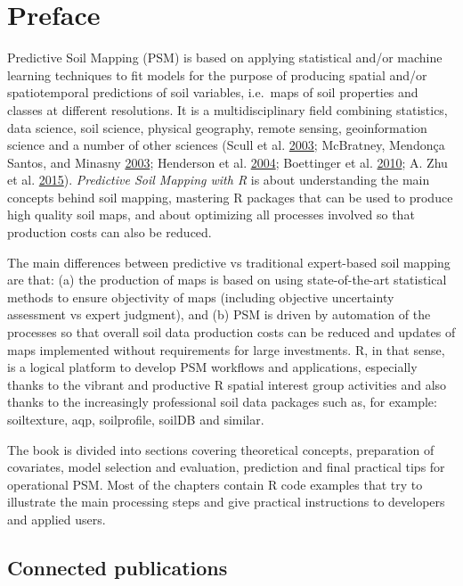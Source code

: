 \documentclass[graybox,natbib,nospthms]{svmono}
\begin{document}
\section*{Preface}\label{preface}

Predictive Soil Mapping (PSM) is based on applying statistical and/or
machine learning techniques to fit models for the purpose of producing
spatial and/or spatiotemporal predictions of soil variables, i.e.~maps
of soil properties and classes at different resolutions. It is a
multidisciplinary field combining statistics, data science, soil
science, physical geography, remote sensing, geoinformation science and
a number of other sciences (Scull et al.
\protect\hyperlink{ref-Scul01}{2003}; McBratney, Mendonça Santos, and
Minasny \protect\hyperlink{ref-MCBRATNEY20033}{2003}; Henderson et al.
\protect\hyperlink{ref-Henderson2004Geoderma}{2004}; Boettinger et al.
\protect\hyperlink{ref-Boettinger2010Springer}{2010}; A. Zhu et al.
\protect\hyperlink{ref-Zhu2015PSM}{2015}). \emph{Predictive Soil Mapping
with R} is about understanding the main concepts behind soil mapping,
mastering R packages that can be used to produce high quality soil maps,
and about optimizing all processes involved so that production costs can
also be reduced.

The main differences between predictive vs traditional expert-based soil
mapping are that: (a) the production of maps is based on using
state-of-the-art statistical methods to ensure objectivity of maps
(including objective uncertainty assessment vs expert judgment), and (b)
PSM is driven by automation of the processes so that overall soil data
production costs can be reduced and updates of maps implemented without
requirements for large investments. R, in that sense, is a logical
platform to develop PSM workflows and applications, especially thanks to
the vibrant and productive R spatial interest group activities and also
thanks to the increasingly professional soil data packages such as, for
example: soiltexture, aqp, soilprofile, soilDB and similar.

The book is divided into sections covering theoretical concepts,
preparation of covariates, model selection and evaluation, prediction
and final practical tips for operational PSM. Most of the chapters
contain R code examples that try to illustrate the main processing steps
and give practical instructions to developers and applied users.

\subsection*{Connected publications}\label{connected-publications}
\end{document}
